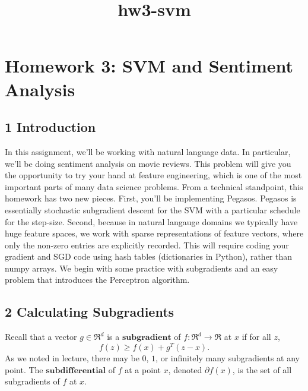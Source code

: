 \documentclass[11pt]{article}
\title{hw3-svm}
\begin{document}
    
    
    \maketitle
    
    

    
    \hypertarget{homework-3-svm-and-sentiment-analysis}{%
\section{Homework 3: SVM and Sentiment
Analysis}\label{homework-3-svm-and-sentiment-analysis}}

    \hypertarget{introduction}{%
\subsection{1 Introduction}\label{introduction}}

In this assignment, we'll be working with natural language data. In
particular, we'll be doing sentiment analysis on movie reviews. This
problem will give you the opportunity to try your hand at feature
engineering, which is one of the most important parts of many data
science problems. From a technical standpoint, this homework has two new
pieces. First, you'll be implementing Pegasos. Pegasos is essentially
stochastic subgradient descent for the SVM with a particular schedule
for the step-size. Second, because in natural langauge domains we
typically have huge feature spaces, we work with sparse representations
of feature vectors, where only the non-zero entries are explicitly
recorded. This will require coding your gradient and SGD code using hash
tables (dictionaries in Python), rather than numpy arrays. We begin with
some practice with subgradients and an easy problem that introduces the
Perceptron algorithm.

    \hypertarget{calculating-subgradients}{%
\subsection{2 Calculating Subgradients}\label{calculating-subgradients}}

Recall that a vector \(g\in\Re^{d}\) is a \(\textbf{subgradient}\) of
\(f:\Re^{d}\to\Re\) at \(x\) if for all \(z\), \[
f(z)\ge f(x)+g^{T}(z-x).
\] As we noted in lecture, there may be \(0\), \(1\), or infinitely many
subgradients at any point. The \(\textbf{subdifferential}\) of \(f\) at
a point \(x\), denoted \(\partial f(x)\), is the set of all subgradients
of \(f\) at \(x\).
\end{document}
